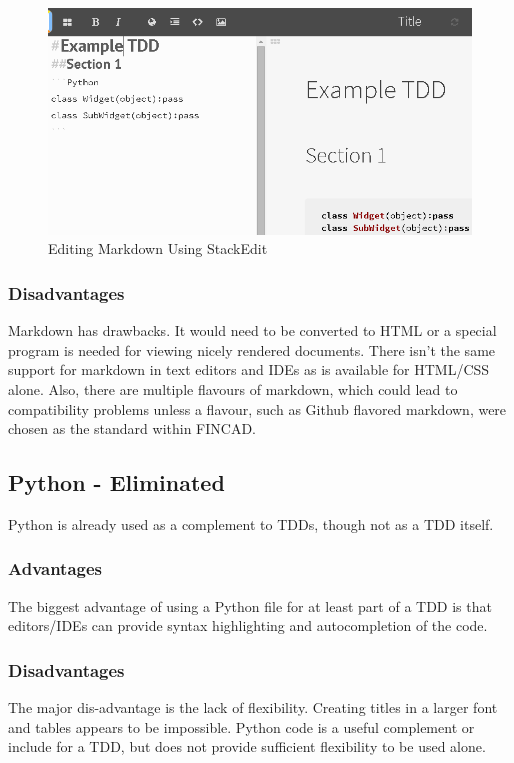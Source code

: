 \documentclass[]{article}
\begin{document}
	\begin{figure}[h]
		\centering
		\includegraphics[scale=.5]{StackEdit.png}
		\caption{Editing Markdown Using StackEdit}
		\label{StackEdit}
	\end{figure}
	
	\subsubsection{Disadvantages}
	Markdown has drawbacks. It would need to be converted to HTML or a special program is needed for viewing nicely rendered documents.  There isn't the same support for markdown in text editors and IDEs as is available for HTML/CSS alone.  Also, there are multiple flavours of markdown, which could lead to compatibility problems unless a flavour, such as Github flavored markdown, were chosen as the standard within FINCAD.


\subsection{Python - Eliminated}
	Python is already used as a complement to TDDs, though not as a TDD itself.
	\subsubsection{Advantages}
	The biggest advantage of using a Python file for at least part of a TDD is that editors/IDEs can provide syntax highlighting and autocompletion of the code.
	
	\subsubsection{Disadvantages}
	The major dis-advantage is the lack of flexibility.  Creating titles in a larger font and tables appears to be impossible.  Python code is a useful complement or include for a TDD, but does not provide sufficient flexibility to be used alone.
\end{document}
